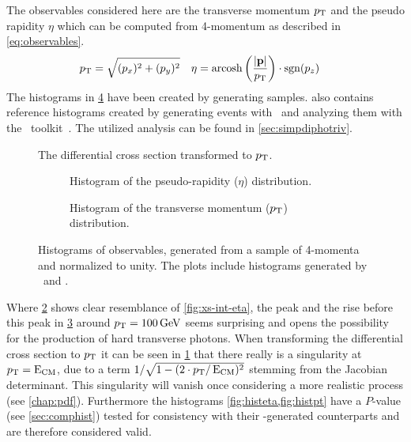 The observables considered here are the transverse momentum \(p_\mathrm{T}\)
and the pseudo rapidity \(\eta\) which can be computed from 4-momentum
as described in \cref{eq:observables}.
%
\begin{align}
  \label{eq:observables}
  p_\mathrm{T} &= \sqrt{(p_x)^2+(p_y)^2} & \eta &=
                                         \operatorname{arcosh}\qty(\frac{\abs{\vb{p}}}{p_\mathrm{T}})\cdot\operatorname{sgn}(p_z)
\end{align}
%
The histograms in \cref{fig:histos} have been created by generating
 samples.  also
contains reference histograms created by generating events with
\sherpa\ and analyzing them with the \rivet\
toolkit~\cite{Bierlich:2019rhm}. The utilized analysis can be found
in \cref{sec:simpdiphotriv}.
%
\begin{figure}[ht]
  \centering {}
  \caption{\label{fig:diff-xs-pt} The differential cross section
    transformed to \(p_\mathrm{T}\).}
\end{figure}
%
\begin{figure}[p]
  \centering

  \begin{subfigure}[b]{\textwidth}
    \centering {}
    \caption{\label{fig:histeta} Histogram of the pseudo-rapidity
      (\(\eta\)) distribution.}
  \end{subfigure}
  \begin{subfigure}[b]{\textwidth}
    \centering {}
    \caption{\label{fig:histpt} Histogram of the transverse momentum
      (\(p_\mathrm{T}\)) distribution.}
  \end{subfigure}
  \caption{\label{fig:histos} Histograms of observables, generated
    from a sample of 4-momenta and normalized to unity. The plots
    include histograms generated by \sherpa\ and \rivet.}
\end{figure}
%
Where \cref{fig:histeta} shows clear resemblance of
\cref{fig:xs-int-eta}, the peak and the rise before this peak in
\cref{fig:histpt} around \(p_\mathrm{T}=\SI{100}{\giga\electronvolt}\) seems
surprising and opens the possibility for the production of hard
transverse photons. When transforming the differential cross section
to \(p_\mathrm{T}\) it can be seen in \cref{fig:diff-xs-pt} that there really
is a singularity at \(p_\mathrm{T} = \operatorname{E_{\text{CM}}}\), due to a term
\(1/\sqrt{1-(2\cdot p_\mathrm{T}/\operatorname{E_{\text{CM}}})^2}\) stemming from the Jacobian
determinant.  This singularity will vanish once considering a more
realistic process (see \cref{chap:pdf}). Furthermore the histograms
\cref{fig:histeta,fig:histpt} have a \(P\)-value (see
\cref{sec:comphist}) tested for consistency with their
\rivet-generated counterparts and are therefore considered valid.

